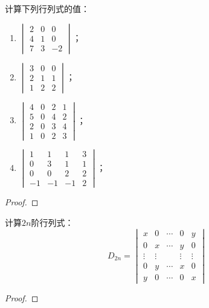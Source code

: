 \begin{problem}
计算下列行列式的值：
\begin{enumerate}
    \item \(\begin{vmatrix}2&0&0\\4&1&0\\7&3&-2\end{vmatrix}\)；
    \item \(\begin{vmatrix}3&0&0\\2&1&1\\1&2&2\end{vmatrix}\)；
    \item \(\begin{vmatrix}4&0&2&1\\5&0&4&2\\2&0&3&4\\1&0&2&3\end{vmatrix}\)；
    \item \(\begin{vmatrix}1&1&1&3\\0&3&1&1\\0&0&2&2\\-1&-1&-1&2\end{vmatrix}\)；
\end{enumerate}
\end{problem}
\begin{proof}

\end{proof}

\begin{problem}
计算\(2n\)阶行列式：
\begin{equation*}
    D_{2n}=
    \begin{vmatrix}
        x      & 0      & \cdots & 0      & y      \\
        0      & x      & \cdots & y      & 0      \\
        \vdots & \vdots &        & \vdots & \vdots \\
        0      & y      & \cdots & x      & 0      \\
        y      & 0      & \cdots & 0      & x
    \end{vmatrix}
\end{equation*}
\end{problem}
\begin{proof}
\end{proof}

